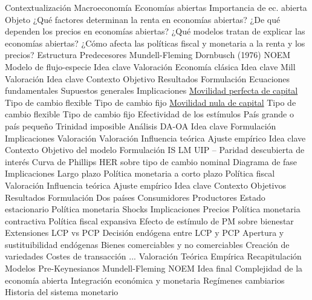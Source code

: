 \documentclass{nuevotema}
\begin{document}
\begin{esquema}[enumerate]
	\1[] 
		\2 Contextualización
			\3 Macroeconomía
			\3 Economías abiertas
			\3 Importancia de ec. abierta
		\2 Objeto
			\3 ¿Qué factores determinan la renta en economías abiertas?
			\3 ¿De qué dependen los precios en economías abiertas?
			\3 ¿Qué modelos tratan de explicar las economías abiertas?
			\3 ¿Cómo afecta las políticas fiscal y monetaria a la renta y los precios?
		\2 Estructura
			\3 Predecesores
			\3 Mundell-Fleming
			\3 Dornbusch (1976)
			\3 NOEM
	\1 
		\2 Modelo de flujo-especie
			\3 Idea clave
			\3 Valoración
		\2 Economía clásica
			\3 Idea clave
			\3 Mill
			\3 Valoración
	\1 
		\2 Idea clave
			\3 Contexto
			\3 Objetivo
			\3 Resultados
		\2 Formulación
			\3 Ecuaciones fundamentales
			\3 Supuestos generales
		\2 Implicaciones
			\3 \underline{Movilidad perfecta de capital}
			\3[] Tipo de cambio flexible
			\3 Tipo de cambio fijo
			\3 \underline{Movilidad nula de capital}
			\3[] Tipo de cambio flexible
			\3 Tipo de cambio fijo
			\3 Efectividad de los estímulos
			\3 País grande o país pequeño
			\3 Trinidad imposible
		\2 Análisis DA-OA
			\3 Idea clave
			\3 Formulación
			\3 Implicaciones
			\3 Valoración
		\2 Valoración
			\3 Influencia teórica
			\3 Ajuste empírico
	\1 
		\2 Idea clave
			\3 Contexto
			\3 Objetivo del modelo
		\2 Formulación
			\3 IS
			\3 LM
			\3 UIP -- Paridad descubierta de interés
			\3 Curva de Phillips
			\3 HER sobre tipo de cambio nominal
			\3 Diagrama de fase
		\2 Implicaciones
			\3 Largo plazo
			\3 Política monetaria a corto plazo
			\3 Política fiscal
		\2 Valoración
			\3 Influencia teórica
			\3 Ajuste empírico
	\1 
		\2 Idea clave
			\3 Contexto
			\3 Objetivos
			\3 Resultados
		\2 Formulación
			\3 Dos países
			\3 Consumidores
			\3 Productores
			\3 Estado estacionario
			\3 Política monetaria
			\3 Shocks
		\2 Implicaciones
			\3 Precios
			\3 Política monetaria contractiva
			\3 Política fiscal expansiva
			\3 Efecto de estímulo de PM sobre bienestar
		\2 Extensiones
			\3 LCP vs PCP
			\3 Decisión endógena entre LCP y PCP
			\3 Apertura y sustituibilidad endógenas
			\3 Bienes comerciables y no comerciables
			\3 Creación de variedades
			\3 Costes de transacción
			\3 ...
		\2 Valoración
			\3 Teórica
			\3 Empírica
	\1[] 
		\2 Recapitulación
			\3 Modelos Pre-Keynesianos
			\3 Mundell-Fleming
			\3 NOEM
		\2 Idea final
			\3 Complejidad de la economía abierta
			\3 Integración económica y monetaria
			\3 Regímenes cambiarios
			\3 Historia del sistema monetario

\end{esquema}
\end{document}
